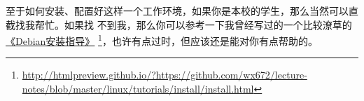 至于如何安装、配置好这样一个工作环境，如果你是本校的学生，那么当然可以直截找我帮忙。如果找
不到我，那么你可以参考一下我曾经写过的一个比较潦草的%
\href{http://htmlpreview.github.io/?https://github.com/wx672/lecture-notes/blob/master/linux/tutorials/install/install.html}{《Debian安装指导》}%
\footnote{\url{http://htmlpreview.github.io/?https://github.com/wx672/lecture-notes/blob/master/linux/tutorials/install/install.html}}，也许有点过时，但应该还是能对你有点帮助的。

